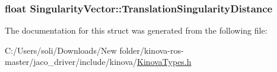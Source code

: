 \subsubsection[{\texorpdfstring{Translation\+Singularity\+Distance}{TranslationSingularityDistance}}]{\setlength{\rightskip}{0pt plus 5cm}float Singularity\+Vector\+::\+Translation\+Singularity\+Distance}\hypertarget{struct_singularity_vector_affe09808366cb7e82427a978cbb1af6a}{}\label{struct_singularity_vector_affe09808366cb7e82427a978cbb1af6a}


The documentation for this struct was generated from the following file\+:\begin{DoxyCompactItemize}
\item 
C\+:/\+Users/soli/\+Downloads/\+New folder/kinova-\/ros-\/master/jaco\+\_\+driver/include/kinova/\hyperlink{_kinova_types_8h}{Kinova\+Types.\+h}\end{DoxyCompactItemize}

